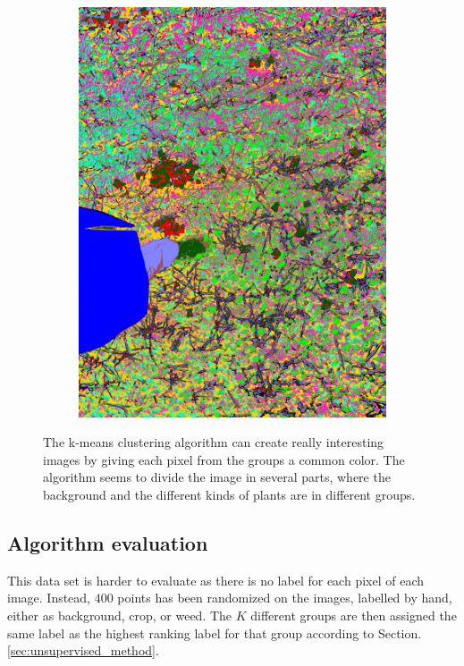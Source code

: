 \begin{figure}[H]
\begin{subfigure}[b]{0.49\textwidth}
        \includegraphics[width=\textwidth]{./figure/result/images/img_kmeans.png}
        \caption{}
		\label{fig:seg_b}
    \end{subfigure}
    \caption{The k-means clustering algorithm can create really interesting images by giving each pixel from the groups a common color. The algorithm seems to divide the image in several parts, where the background and the different kinds of plants are in different groups.}
    \label{fig:kmeans}
\end{figure}

\subsection{Algorithm evaluation}

This data set is harder to evaluate as there is no label for each pixel of each image. Instead, $400$ points has been randomized on the images, labelled by hand, either as background, crop, or weed. The $K$ different groups are then assigned the same label as the highest ranking label for that group according to Section.\ref{sec:unsupervised_method}.


